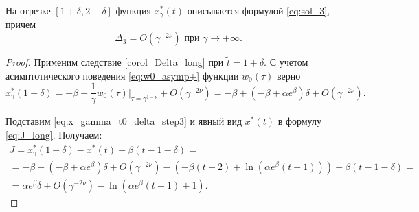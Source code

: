 \begin{lemma}
	\label{lm:Delta3}
	На отрезке $[1 + \delta, 2 - \delta]$ функция $x_\gamma^*(t)$ описывается формулой \eqref{eq:sol_3}, причем
	\[
	\Delta_3 = O(\gamma^{-2\nu}) \text{ при } \gamma \to +\infty.
	\]
\end{lemma}
\begin{proof}
Применим следствие \ref{corol_Delta_long} при $\tilde{t} = 1 + \delta$. С учетом асимптотического поведения \eqref{eq:w0_asymp+} функции $w_0(\tau)$ верно
\begin{equation}
\label{eq:x_gamma_t0_delta_step3}
	x_\gamma^*(1 + \delta) = -\beta + \frac{1}{\gamma} w_0(\tau)|_{\tau=\gamma^{1 - \nu}} + O(\gamma^{-2\nu}) = -\beta + (-\beta + \alpha e^\beta)\delta + O(\gamma^{-2\nu}).
\end{equation}

Подставим \eqref{eq:x_gamma_t0_delta_step3} и явный вид $x^*(t)$ в формулу \eqref{eq:J_long}. Получаем:
\small
\begin{multline}
	\label{eq:J_step3}
	J = x_\gamma^*(1 + \delta) - x^*(t) - \beta(t - 1 - \delta) =\\
	= -\beta + (-\beta + \alpha e^\beta)\delta + O(\gamma^{-2\nu}) - 
	(-\beta(t - 2) + \ln(\alpha e^{\beta}(t - 1))) - \beta (t - 1 - \delta) = \\
	 =\alpha e^\beta\delta + O(\gamma^{-2\nu}) - \ln(\alpha e^{\beta}(t - 1) + 1).
\end{multline}
\normalsize


\end{proof}
